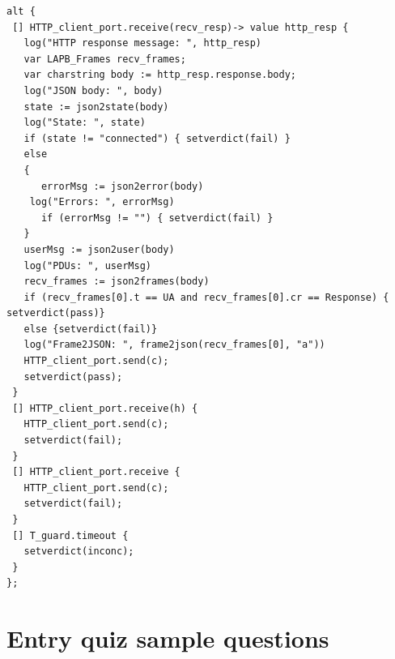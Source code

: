 \documentclass[a4paper]{article}
\begin{document}
{\footnotesize
\begin{lstlisting}
alt {
 [] HTTP_client_port.receive(recv_resp)-> value http_resp {
   log("HTTP response message: ", http_resp)
   var LAPB_Frames recv_frames;
   var charstring body := http_resp.response.body;
   log("JSON body: ", body)
   state := json2state(body)
   log("State: ", state)
   if (state != "connected") { setverdict(fail) }
   else
   {
      errorMsg := json2error(body)
    log("Errors: ", errorMsg)
      if (errorMsg != "") { setverdict(fail) }
   }
   userMsg := json2user(body)
   log("PDUs: ", userMsg)
   recv_frames := json2frames(body)
   if (recv_frames[0].t == UA and recv_frames[0].cr == Response) { setverdict(pass)}
   else {setverdict(fail)}
   log("Frame2JSON: ", frame2json(recv_frames[0], "a"))
   HTTP_client_port.send(c);
   setverdict(pass);
 }
 [] HTTP_client_port.receive(h) { 
   HTTP_client_port.send(c);
   setverdict(fail);
 }
 [] HTTP_client_port.receive {
   HTTP_client_port.send(c); 
   setverdict(fail); 
 }  
 [] T_guard.timeout {
   setverdict(inconc); 
 }  
};
\end{lstlisting}
}

\appendix

\section{Entry quiz sample questions}
\end{document}
